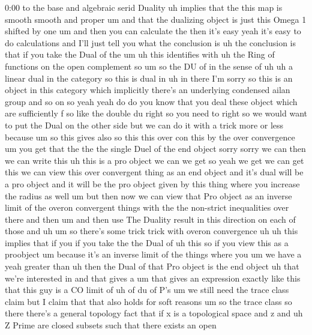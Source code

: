 \begin{unfinished}{0:00}
to  the
base  and  algebraic  serid  Duality  uh
implies  that  the  this  map  is  smooth
smooth  and  proper  um  and  that  the
dualizing  object  is  just  this  Omega  1
shifted  by
one
um  and  then  you  can  calculate  the  then
it's  easy  yeah  it's  easy  to  do
calculations  and  I'll  just  tell  you  what
the  conclusion  is  uh  the  conclusion  is
that  if  you  take  the  Dual  of  the
um
uh  this  identifies  with  uh  the  Ring
of  functions  on  the  open  complement
so
um  so  the
DU
of  in  the  sense  of  uh  uh  a  linear  dual
in  the  category  so  this  is  dual  in
uh  in
there  I'm
sorry  so  this  is  an  object  in  this
category  which  implicitly  there's  an
underlying  condensed  ailan  group  and  so
on  so  yeah  yeah  do  do  you  know  that  you
deal  these  object  which  are  sufficiently
f  so  like  the  double  du  right  so  you
need  to  right  so  we  would  want  to  put
the  Dual  on  the  other  side  but  we  can  do
it  with  a  trick  more  or  less  because
um  so  this  gives  also  so  this  this  over
con  this  by  the  over  convergence  um  you
get  that  the
the  the  single  Duel  of  the  end  object
sorry  sorry  we  can  then  we  can  write
this  uh  this  is  a  pro  object  we  can  we
get  so  yeah  we  get  we  can  get  this  we
can  view  this  over  convergent  thing  as
an  end  object  and  it's  dual  will  be  a
pro  object  and  it  will  be  the  pro  object
given  by  this  thing  where  you  increase
the  radius  as  well  um  but  then  now  we
can  view  that  Pro  object  as  an  inverse
limit  of  the  overon  convergent  things
with  the  the  non-strict  inequalities
over  there  and  then  um  and  then  use  The
Duality  result  in  this  direction  on  each
of  those  and
uh  um  so  there's  some  trick  trick  with
overon  convergence
uh  uh  this  implies  that  if  you  if  you
take  the  the  Dual  of  uh  this
so  if  you  view  this  as  a
proobject  um  because  it's  an  inverse
limit  of  the  things  where  you  um  we  have
a  yeah  greater  than  uh  then  the  Dual  of
that  Pro  object  is  the  end  object  uh
that  we're  interested
in
and  that  gives  a
um  that  gives  an  expression  exactly  like
this  that  this  guy  is  a  CO  limit  of  uh
of  du  of
P's  um  we  still  need  the  trace  class
claim  but  I  claim  that  that  also  holds
for  soft  reasons
um
so  the  trace  class
so  there  there's  a  general  topology  fact
that  if  x  is  a  topological  space  and  z
and  uh  Z  Prime  are  closed
subsets  such  that  there
exists  an  open

\end{unfinished}
